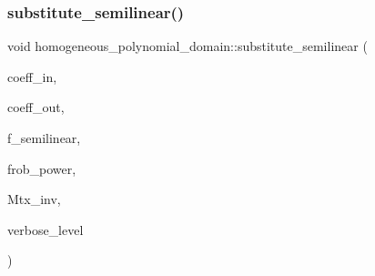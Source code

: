 \mbox{\label{classhomogeneous__polynomial__domain_ae16fefaacc3385f9f385d1dd6df7ea4d}} 
\subsubsection{\texorpdfstring{substitute\+\_\+semilinear()}{substitute\_semilinear()}}
{\footnotesize\ttfamily void homogeneous\+\_\+polynomial\+\_\+domain\+::substitute\+\_\+semilinear (\begin{DoxyParamCaption}\item[{\mbox{\hyperlink{galois_8h_a09fddde158a3a20bd2dcadb609de11dc}{I\+NT}} $\ast$}]{coeff\+\_\+in,  }\item[{\mbox{\hyperlink{galois_8h_a09fddde158a3a20bd2dcadb609de11dc}{I\+NT}} $\ast$}]{coeff\+\_\+out,  }\item[{\mbox{\hyperlink{galois_8h_a09fddde158a3a20bd2dcadb609de11dc}{I\+NT}}}]{f\+\_\+semilinear,  }\item[{\mbox{\hyperlink{galois_8h_a09fddde158a3a20bd2dcadb609de11dc}{I\+NT}}}]{frob\+\_\+power,  }\item[{\mbox{\hyperlink{galois_8h_a09fddde158a3a20bd2dcadb609de11dc}{I\+NT}} $\ast$}]{Mtx\+\_\+inv,  }\item[{\mbox{\hyperlink{galois_8h_a09fddde158a3a20bd2dcadb609de11dc}{I\+NT}}}]{verbose\+\_\+level }\end{DoxyParamCaption})}

\mbox{\label{classhomogeneous__polynomial__domain_ae1b2b16b50fd6646a3332da31bb0ad23}} 

